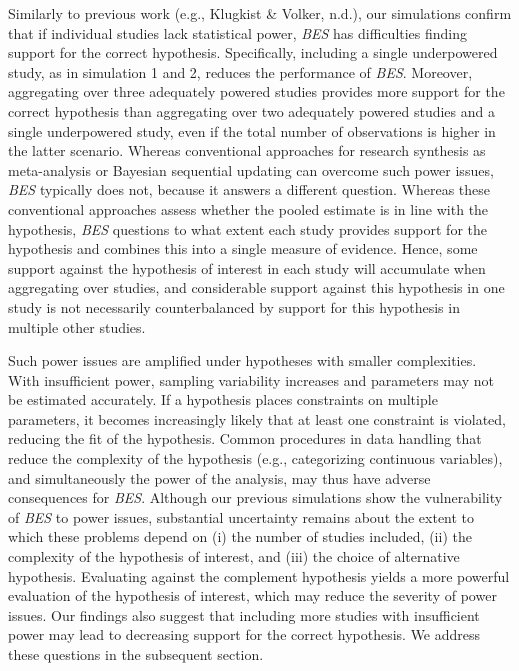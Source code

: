 \documentclass[
]{interact}
\begin{document}
                    Similarly to previous work (e.g., Klugkist \& Volker, n.d.), our
                    simulations confirm that if individual studies lack statistical power,
                    \emph{BES} has difficulties finding support for the correct hypothesis.
                    Specifically, including a single underpowered study, as in simulation 1
                    and 2, reduces the performance of \emph{BES}. Moreover, aggregating over
                    three adequately powered studies provides more support for the correct
                    hypothesis than aggregating over two adequately powered studies and a
                    single underpowered study, even if the total number of observations is
                    higher in the latter scenario. Whereas conventional approaches for
                    research synthesis as meta-analysis or Bayesian sequential updating can
                    overcome such power issues, \emph{BES} typically does not, because it
                    answers a different question. Whereas these conventional approaches
                    assess whether the pooled estimate is in line with the hypothesis,
                    \emph{BES} questions to what extent each study provides support for the
                    hypothesis and combines this into a single measure of evidence. Hence,
                    some support against the hypothesis of interest in each study will
                    accumulate when aggregating over studies, and considerable support
                    against this hypothesis in one study is not necessarily counterbalanced
                    by support for this hypothesis in multiple other studies.
                    
                    Such power issues are amplified under hypotheses with smaller
                    complexities. With insufficient power, sampling variability increases
                    and parameters may not be estimated accurately. If a hypothesis places
                    constraints on multiple parameters, it becomes increasingly likely that
                    at least one constraint is violated, reducing the fit of the hypothesis.
                    Common procedures in data handling that reduce the complexity of the
                    hypothesis (e.g., categorizing continuous variables), and simultaneously
                    the power of the analysis, may thus have adverse consequences for
                    \emph{BES}. Although our previous simulations show the vulnerability of
                    \emph{BES} to power issues, substantial uncertainty remains about the
                    extent to which these problems depend on (i) the number of studies
                    included, (ii) the complexity of the hypothesis of interest, and (iii)
                    the choice of alternative hypothesis. Evaluating against the complement
                    hypothesis yields a more powerful evaluation of the hypothesis of
                    interest, which may reduce the severity of power issues. Our findings
                    also suggest that including more studies with insufficient power may
                    lead to decreasing support for the correct hypothesis. We address these
                    questions in the subsequent section.
                    
\end{document}
